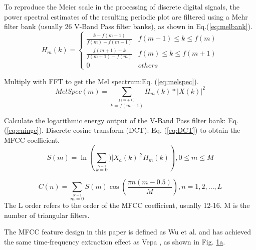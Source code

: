 To reproduce the Meier scale in the processing of discrete digital signals, the power spectral estimates of the resulting periodic plot are filtered using a Mehr filter bank (usually 26 V-Band Pass filter banks), as shown in Eq.(\ref{eq:melbank}).
\begin{equation}
H_m(k)=
	\begin{cases}
	\frac{k-f(m-1)}{f(m)-f(m-1)} & f(m-1)\leq k \leq f(m)\\
	\frac{f(m+1)-k}{f(m+1)-f(m)} & f(m)\leq k \leq f(m+1)\\
	{0} & others
	\end{cases}
	\label{eq:melbank}
\end{equation}

Multiply with FFT to get the Mel spectrum:Eq. (\ref{eq:melspec}).
\begin{equation}
MelSpec(m)=\sum\limits_{k=f(m-1)}\limits^{f(m+1)}H_m(k)*\left|X(k)\right|^2
	\label{eq:melspec}
\end{equation}

Calculate the logarithmic energy output of the V-Band Pass filter bank: Eq.(\ref{eq:eninge}). Discrete cosine transform (DCT): Eq. (\ref{eq:DCT}) to obtain the MFCC coefficient.
\begin{equation}
S(m)=\ln \left( {\sum\limits_{k=0}\limits^{N-1})\left|X_a(k)\right|^2H_m(k)}\right),
0 \leq m \leq M
	\label{eq:eninge}
\end{equation}

\begin{equation}
C(n)=\sum\limits_{m=0}\limits^{N-1}S(m) \cos \left( {\frac{\pi n(m-0.5)}{M}}\right)
,n=1,2,...,L
	\label{eq:DCT}
\end{equation}
The L order refers to the order of the MFCC coefficient, usually 12-16. M is the number of triangular filters.

The MFCC feature design in this paper is defined as Wu et al. \cite{wu2010hidden} and has achieved the same time-frequency extraction effect as Vepa \cite{vepa2009classification}, as shown in Fig. \hyperref[FIG:Methodology]{1a}.
